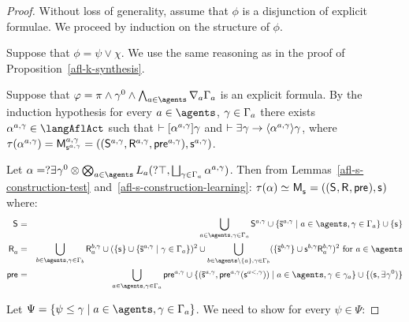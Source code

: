 \begin{proof}
Without loss of generality, assume that $\phi$ is a disjunction of explicit formulae.
We proceed by induction on the structure of $\phi$.

Suppose that $\phi = \psi \lor \chi$. We use the same reasoning as in the proof of Proposition~\ref{afl-k-synthesis}.

Suppose that $\phi = \pi \land \gamma^0 \land \bigwedge_{\agentA \in \agents} \coversA \Gamma_\agentA$ is an explicit formula.
By the induction hypothesis for every $\agentA \in \agents$, $\gamma \in \Gamma_a$ there exists $\alpha^{\agentA,\gamma} \in \langAflAct$ such that $\vdash {[ {\alpha^{a,\gamma}} ]} \gamma$ and $\proves \somerefs \gamma \implies \actionE{\alpha^{\agentA,\gamma}} \gamma$, where $\tau(\alpha^{\agentA,\gamma}) = \aPModel[\agentA,\gamma]{\aStateS[\agentA,\gamma]} = \aPModelTuple[\agentA,\gamma]{\aStateS[\agentA,\gamma]}$.

Let $\alpha = \test{\somerefs \gamma^0} \compose \bigcompose_{\agentA \in \agents} \learnsA (\test{\top}, \bigchoice_{\gamma \in \Gamma_\agentA} \alpha^{\agentA,\gamma})$.
Then from Lemmas~\ref{afl-s-construction-test} and~\ref{afl-s-construction-learning}: $\tau(\alpha) \bisimilar \aPModel{\aStateS} = \aPModelTuple{\aStateS}$ where:
\begin{eqnarray*}
    \aStates &=& \bigcup_{\agentA \in \agents, \gamma \in \Gamma_\agentA} \aStates[\agentA,\gamma] \cup \{\aPStateS[\agentA,\gamma] \mid \agentA \in \agents, \gamma \in \Gamma_\agentA\} \cup \{\aStateS\}\\
    \aAccessibility{\agentA} &=& \bigcup_{\agentB \in \agents, \gamma \in \Gamma_\agentB} \aAccessibility[\agentB,\gamma]{\agentA} \cup (\{\aStateS\} \cup \{\aPStateS[\agentA,\gamma] \mid \gamma \in \Gamma_\agentA\})^2 \cup \bigcup_{\agentB \in \agents \setminus \{\agentA\}, \gamma \in \Gamma_\agentB} (\{\aPStateS[\agentB,\gamma]\} \cup \aStateS[\agentB,\gamma] \aAccessibility[\agentB,\gamma]{\agentA})^2 \text{ for } \agentA \in \agents\\
    \aPrecondition &=& \bigcup_{\agentA \in \agents, \gamma \in \Gamma_\agentA} \aPrecondition[\agentA,\gamma] \cup \{(\aPStateS[\agentA,\gamma], \aPrecondition[\agentA,\gamma](\aStateS[\agentA<,\gamma])) \mid \agentA \in \agents, \gamma \in \gamma_\agentA\} \cup \{(\aStateS, \somerefs \gamma^0)\}
\end{eqnarray*}

Let $\Psi = \{\psi \leq \gamma \mid \agentA \in \agents, \gamma \in \Gamma_\agentA\}$. We need to show for every $\psi \in \Psi$:


\end{proof}
